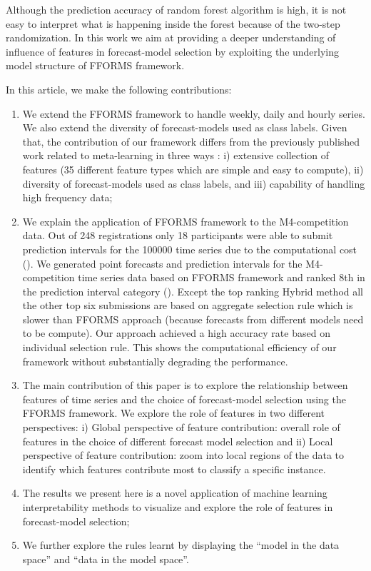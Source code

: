 \documentclass[11pt,a4paper,]{article}
\providecommand{\tightlist}{%
  \setlength{\itemsep}{0pt}\setlength{\parskip}{0pt}}
\begin{document}
Although the prediction accuracy of random forest algorithm is high, it
is not easy to interpret what is happening inside the forest because of
the two-step randomization. In this work we aim at providing a deeper
understanding of influence of features in forecast-model selection by
exploiting the underlying model structure of FFORMS framework.

In this article, we make the following contributions:

\begin{enumerate}
\def\labelenumi{\arabic{enumi}.}
\tightlist
\item
  We extend the FFORMS framework to handle weekly, daily and hourly
  series. We also extend the diversity of forecast-models used as class
  labels. Given that, the contribution of our framework differs from the
  previously published work related to meta-learning in three ways
  \autocites{prudencio2004meta}{lemke2010meta}{kuck2016meta}: i)
  extensive collection of features (35 different feature types which are
  simple and easy to compute), ii) diversity of forecast-models used as
  class labels, and iii) capability of handling high frequency data;
\item
  We explain the application of FFORMS framework to the M4-competition
  data. Out of 248 registrations only 18 participants were able to
  submit prediction intervals for the 100000 time series due to the
  computational cost (\textcite{Makridakis2018dx}). We generated point
  forecasts and prediction intervals for the M4-competition time series
  data based on FFORMS framework and ranked 8th in the prediction
  interval category (\textcite{Makridakis2018dx}). Except the top
  ranking Hybrid method all the other top six submissions are based on
  aggregate selection rule which is slower than FFORMS approach (because
  forecasts from different models need to be compute). Our approach
  achieved a high accuracy rate based on individual selection rule. This
  shows the computational efficiency of our framework without
  substantially degrading the performance.
\item
  The main contribution of this paper is to explore the relationship
  between features of time series and the choice of forecast-model
  selection using the FFORMS framework. We explore the role of features
  in two different perspectives: i) Global perspective of feature
  contribution: overall role of features in the choice of different
  forecast model selection and ii) Local perspective of feature
  contribution: zoom into local regions of the data to identify which
  features contribute most to classify a specific instance.
\item
  The results we present here is a novel application of machine learning
  interpretability methods to visualize and explore the role of features
  in forecast-model selection;
\item
  We further explore the rules learnt by displaying the ``model in the
  data space'' and ``data in the model space''.
\end{enumerate}
\end{document}
